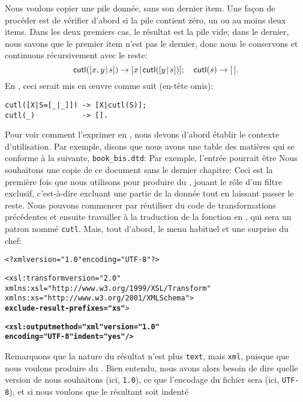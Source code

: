 
Nous voulons copier une pile donnée, sans son dernier item. Une façon
de procéder est de vérifier d'abord si la pile contient zéro, un ou au
moins deux items. Dans les deux premiers cas, le résultat est la pile
vide; dans le dernier, nous savons que le premier item n'est pas le
dernier, donc nous le conservons et continuons récursivement avec le
reste:
\begin{equation*}
\textsf{cutl}([{x,y}\!\mid\!{s}]) \rightarrow [{x}\!\mid\!{\textsf{cutl}([{y}\!\mid\!{s}])}];\quad
\textsf{cutl}(s) \rightarrow [\,].
\end{equation*}
En \Erlang, ceci serait mis en {\oe}uvre comme suit (en-tête omis):
\begin{verbatim}
cutl([X|S=[_|_]]) -> [X|cutl(S)];
cutl(_)           -> [].
\end{verbatim}
Pour voir comment l'exprimer en \XSLT, nous devons d'abord établir le
contexte d'utilisation. Par exemple, disons que nous avons une table
des matières qui se conforme à la \DTD suivante, \texttt{book\_bis.dtd}:
\noindent Par exemple, l'entrée pourrait être
\noindent Nous souhaitons une copie de ce document \XML sans le
dernier chapitre:
\noindent Ceci est la première fois que nous utilisons \XSLT pour
produire du \XML, jouant le rôle d'un filtre exclusif, c'est-à-dire
excluant une partie de la donnée tout en laissant passer le
reste. Nous pouvons commencer par réutiliser du code de
transformations précédentes et ensuite travailler à la traduction de
la fonction  en \XSLT, qui sera un patron nommé
\texttt{cutl}. Mais, tout d'abord, le menu habituel et une surprise du chef:
\begin{alltt}
\small<?xml version="1.0" encoding="UTF-8"?>

<xsl:transform version="2.0"
               xmlns:xsl="http://www.w3.org/1999/XSL/Transform"
               xmlns:xs="http://www.w3.org/2001/XMLSchema">
               \textbf{exclude-result-prefixes="xs"}>

  \textbf{<xsl:output method="xml" version="1.0"
              encoding="UTF-8" indent="yes"/>}
\end{alltt}
Remarquons que la nature du résultat n'est plus \texttt{text}, mais
\texttt{xml}, puisque que nous voulons produire du \XML. Bien entendu,
nous avons alors besoin de dire quelle version de \XML nous souhaitons
(ici, \texttt{1.0}), ce que l'encodage du fichier sera (ici,
\texttt{UTF-8}), et si nous voulons que le \XML résultant soit indenté
